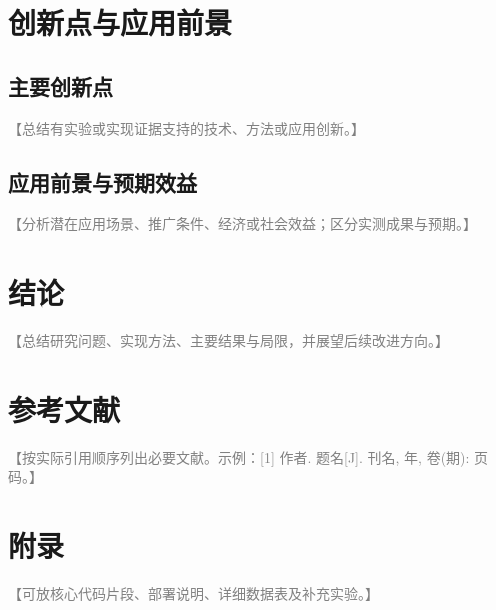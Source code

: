 \documentclass[UTF8,a4paper,zihao=-4]{ctexart}
\newcommand{\fillhint}[1]{\textcolor{gray}{【#1】}}
\begin{document}
\section{创新点与应用前景}
\subsection{主要创新点}
\fillhint{总结有实验或实现证据支持的技术、方法或应用创新。}

\subsection{应用前景与预期效益}
\fillhint{分析潜在应用场景、推广条件、经济或社会效益；区分实测成果与预期。}

\section{结论}
\fillhint{总结研究问题、实现方法、主要结果与局限，并展望后续改进方向。}

\section*{参考文献}
{\fontsize{10.5pt}{20pt}\selectfont
\noindent\fillhint{按实际引用顺序列出必要文献。示例：[1] 作者. 题名[J]. 刊名, 年, 卷(期): 页码。}\par
}

\section*{附录}
\fillhint{可放核心代码片段、部署说明、详细数据表及补充实验。}
\end{document}
